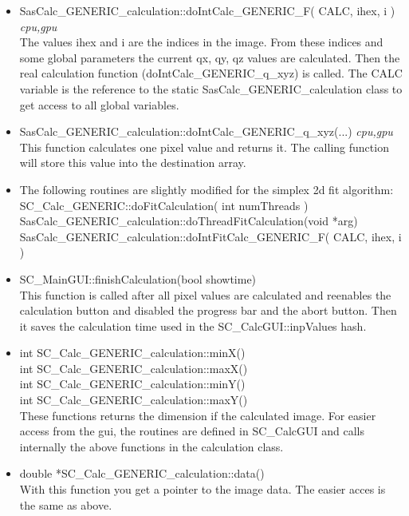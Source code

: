 \documentclass[11pt]{article} %
\begin{document}
\begin{itemize}
\item SasCalc\_GENERIC\_calculation::doIntCalc\_GENERIC\_F( CALC, ihex, i ) {\it cpu,gpu} \\
	The values ihex and i are the indices in the image. From these indices and some global parameters the current qx, qy, qz values are calculated. Then the real calculation function (doIntCalc\_GENERIC\_q\_xyz) is called. The CALC variable is the reference to the static SasCalc\_GENERIC\_calculation class to get access to all global variables.

\item SasCalc\_GENERIC\_calculation::doIntCalc\_GENERIC\_q\_xyz(...) {\it cpu,gpu} \\
	This function calculates one pixel value and returns it. The calling function will store this value into the destination array.

\item The following routines are slightly modified for the simplex 2d fit algorithm: \\
	SC\_Calc\_GENERIC::doFitCalculation( int numThreads ) \\
	SasCalc\_GENERIC\_calculation::doThreadFitCalculation(void *arg) \\
	SasCalc\_GENERIC\_calculation::doIntFitCalc\_GENERIC\_F( CALC, ihex, i )

\item SC\_MainGUI::finishCalculation(bool showtime) \\
	This function is called after all pixel values are calculated and reenables the calculation button and disabled the progress bar and the abort button. Then it saves the calculation time used in the SC\_CalcGUI::inpValues hash.

\item int SC\_Calc\_GENERIC\_calculation::minX() \\
	int SC\_Calc\_GENERIC\_calculation::maxX() \\
	int SC\_Calc\_GENERIC\_calculation::minY() \\
	int SC\_Calc\_GENERIC\_calculation::maxY() \\
	These functions returns the dimension if the calculated image. For easier access from the gui, the routines are defined in SC\_CalcGUI and calls internally the above functions in the calculation class.

\item double *SC\_Calc\_GENERIC\_calculation::data() \\
	With this function you get a pointer to the image data. The easier acces is the same as above.

\end{itemize}
\end{document}
